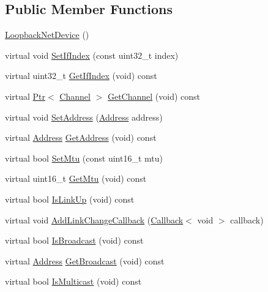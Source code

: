 \subsection*{Public Member Functions}
\begin{DoxyCompactItemize}
\item 
\hyperlink{classns3_1_1LoopbackNetDevice_aa0ff9e728fe8a9acafc8f56ffaf9cbea}{Loopback\+Net\+Device} ()
\item 
virtual void \hyperlink{classns3_1_1LoopbackNetDevice_a35aa739d7e48b0d0f574a0846aa2c8fa}{Set\+If\+Index} (const uint32\+\_\+t index)
\item 
virtual uint32\+\_\+t \hyperlink{classns3_1_1LoopbackNetDevice_a0e85f4b59c8ced3a2b69609f91fcd64d}{Get\+If\+Index} (void) const 
\item 
virtual \hyperlink{classns3_1_1Ptr}{Ptr}$<$ \hyperlink{classns3_1_1Channel}{Channel} $>$ \hyperlink{classns3_1_1LoopbackNetDevice_a1e9d74faf50c64a390693bec6c916a57}{Get\+Channel} (void) const 
\item 
virtual void \hyperlink{classns3_1_1LoopbackNetDevice_ae194813879ce85bec09ba22501decb7e}{Set\+Address} (\hyperlink{classns3_1_1Address}{Address} address)
\item 
virtual \hyperlink{classns3_1_1Address}{Address} \hyperlink{classns3_1_1LoopbackNetDevice_a74de91df2349ac83f227760aee230083}{Get\+Address} (void) const 
\item 
virtual bool \hyperlink{classns3_1_1LoopbackNetDevice_a0c401b78801c1e41d7fb15e708787438}{Set\+Mtu} (const uint16\+\_\+t mtu)
\item 
virtual uint16\+\_\+t \hyperlink{classns3_1_1LoopbackNetDevice_a557a8a3d4f69e50678842028480ada36}{Get\+Mtu} (void) const 
\item 
virtual bool \hyperlink{classns3_1_1LoopbackNetDevice_a109ee470b78b34b42734ada81e28aea7}{Is\+Link\+Up} (void) const 
\item 
virtual void \hyperlink{classns3_1_1LoopbackNetDevice_a9252996d4ca666705fb334c9a664e5fd}{Add\+Link\+Change\+Callback} (\hyperlink{classns3_1_1Callback}{Callback}$<$ void $>$ callback)
\item 
virtual bool \hyperlink{classns3_1_1LoopbackNetDevice_a63c4ce91fb02fc9a9dcd451d183e3bba}{Is\+Broadcast} (void) const 
\item 
virtual \hyperlink{classns3_1_1Address}{Address} \hyperlink{classns3_1_1LoopbackNetDevice_a5016750dde40db94bddb53640313a239}{Get\+Broadcast} (void) const 
\item 
virtual bool \hyperlink{classns3_1_1LoopbackNetDevice_a889c040c2e85a29fdebb00ebba1854ed}{Is\+Multicast} (void) const 

\end{DoxyCompactItemize}
